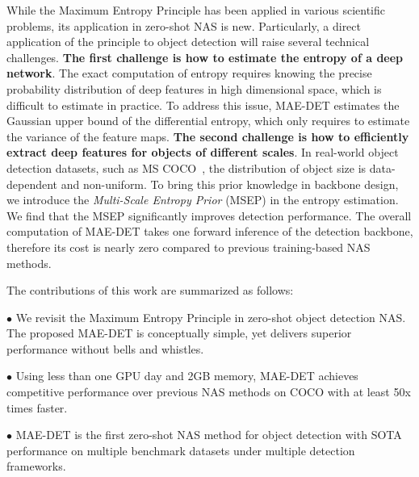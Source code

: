 \documentclass[nohyperref]{article}
\theoremstyle{plain}
\theoremstyle{definition}
\theoremstyle{remark}
\begin{document}
While the Maximum Entropy Principle has been applied in various scientific problems, its application in zero-shot NAS is new. Particularly, a direct application of the principle to object detection will raise several technical challenges. \textbf{The first challenge is how to estimate the entropy of a deep network}. The exact computation of entropy requires knowing the precise probability distribution of deep features in high dimensional space, which is difficult to estimate in practice. To address this issue, MAE-DET estimates the Gaussian upper bound of the differential entropy, which only requires to estimate the variance of the feature maps. \textbf{The second challenge is how to efficiently extract deep features for objects of different scales}. In real-world object detection datasets, such as MS COCO~\citep{coco}, the distribution of object size is data-dependent and non-uniform. To bring this prior knowledge in backbone design, we introduce the \textit{Multi-Scale Entropy Prior} (MSEP) in the entropy estimation. We find that the MSEP significantly improves detection performance. The overall computation of MAE-DET takes one forward inference of the detection backbone, therefore its cost is nearly zero compared to previous training-based NAS methods.


The contributions of this work are summarized as follows:
\begin{compactitem}
\item[$\bullet$] We revisit the Maximum Entropy Principle in zero-shot object detection NAS. The proposed MAE-DET is conceptually simple, yet delivers superior performance without bells and whistles.
\item[$\bullet$] Using less than one GPU day and 2GB memory, MAE-DET achieves competitive performance over previous NAS methods on COCO with at least 50x times faster.
\item[$\bullet$] MAE-DET is the first zero-shot NAS method for object detection with SOTA performance on multiple benchmark datasets under multiple detection frameworks. 
\end{compactitem}
\end{document}

